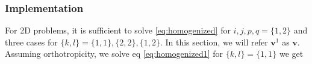 \documentclass[10pt]{article}
\newcommand{\e}[1]{\textbf{#1}}
\begin{document}
\subsubsection{Implementation}
For 2D problems, it is sufficient to solve \eqref{eq:homogenized} for $i, j, p, q = \{1, 2\}$ and three cases for $\{k, l\} = \{1,1\}, \{2,2\}, \{1,2\}$. In this section, we will refer $\e v^1$ as $\e v$. Assuming orthotropicity, we solve eq \eqref{eq:homogenized1} for $\{k,l\} = \{1,1\}$ we get
\end{document}
